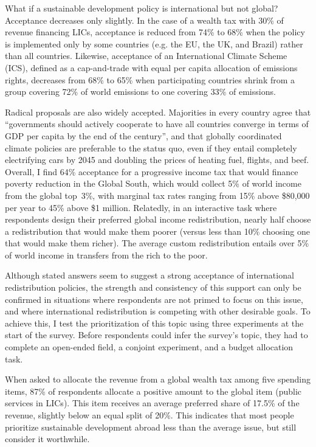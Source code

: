 \documentclass[12pt,english]{article}
\begin{document}
\begin{bibunit}
What if a sustainable development policy is international but not global? Acceptance decreases only slightly. In the case of a wealth tax with 30\% of revenue financing LICs, acceptance is reduced from 74\% to 68\% when the policy is implemented only by some countries (e.g. the EU, the UK, and Brazil) rather than all countries. Likewise, acceptance of an International Climate Scheme (ICS), defined as a cap-and-trade with equal per capita allocation of emissions rights, decreases from 68\% to 65\% when participating countries shrink from a group covering 72\% of world emissions to one covering 33\% of emissions.

Radical proposals are also widely accepted. Majorities in every country agree that ``governments should actively cooperate to have all countries converge in terms of GDP per capita by the end of the century'', and that globally coordinated climate policies are preferable to the status quo, even if they entail completely electrifying cars by 2045 and doubling the prices of heating fuel, flights, and beef. Overall, I find 64\% acceptance for a progressive income tax that would finance poverty reduction in the Global South, which would collect 5\% of world income from the global top~3\%, with marginal tax rates ranging from 15\% above \$80,000 per year to 45\% above \$1 million. Relatedly, in an interactive task where respondents design their preferred global income redistribution, nearly half choose a redistribution that would make them poorer (versus less than 10\% choosing one that would make them richer). The average custom redistribution entails over 5\% of world income in transfers from the rich to the poor. 

Although stated answers seem to suggest a strong acceptance of international redistribution policies, the strength and consistency of this support can only be confirmed in situations where respondents are not primed to focus on this issue, and where international redistribution is competing with other desirable goals. To achieve this, I test the prioritization of this topic using three experiments at the start of the survey. 
Before respondents could infer the survey's topic, they had to complete an open-ended field, a conjoint experiment, and a budget allocation task. 

When asked to allocate the revenue from a %
global wealth tax among five spending items, 87\% of respondents allocate a positive amount to the global item (public services in LICs). This item receives an average preferred share of 17.5\% of the revenue, slightly below an equal split of 20\%. %
This indicates that most people prioritize sustainable development abroad less than the average issue, but still consider it worthwhile. 


\end{bibunit}
\end{document}
